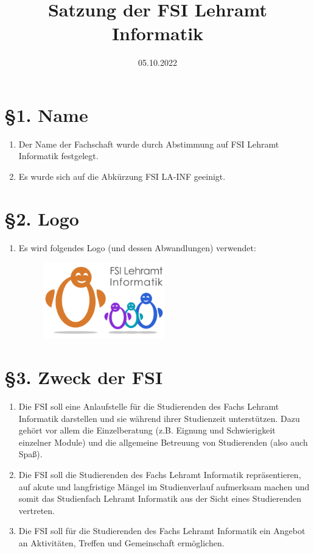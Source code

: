 \documentclass[a4paper,12pt]{article}
\title{Satzung der FSI Lehramt Informatik}
\date{05.10.2022}
\begin{document}
\maketitle

\section*{§1. Name}

\begin{enumerate}
    \item Der Name der Fachschaft wurde durch Abstimmung auf FSI Lehramt Informatik festgelegt.
    \item Es wurde sich auf die Abkürzung FSI LA-INF geeinigt.
\end{enumerate}

\section*{§2. Logo}

\begin{enumerate}
	\item
		Es wird folgendes Logo (und dessen Abwandlungen) verwendet:
		\begin{figure}[h]
			\includegraphics[width=0.5\textwidth]{img/logo.png}
		\end{figure}
\end{enumerate}

\section*{§3. Zweck der FSI}

\begin{enumerate}
	\item
		Die FSI soll eine Anlaufstelle für die Studierenden des Fachs
		Lehramt Informatik darstellen und sie während ihrer Studienzeit
		unterstützen. Dazu gehört vor allem die Einzelberatung (z.B.
		Eignung und Schwierigkeit einzelner Module) und die allgemeine
		Betreuung von Studierenden (also auch Spaß).
	\item
		Die FSI soll die Studierenden des Fachs Lehramt Informatik
		repräsentieren, auf akute und langfristige Mängel im
		Studienverlauf aufmerksam machen und somit das Studienfach
		Lehramt Informatik aus der Sicht eines Studierenden vertreten.
	\item
		Die FSI soll für die Studierenden des Fachs Lehramt Informatik
		ein Angebot an Aktivitäten, Treffen und Gemeinschaft
		ermöglichen.
\end{enumerate}
\end{document}
